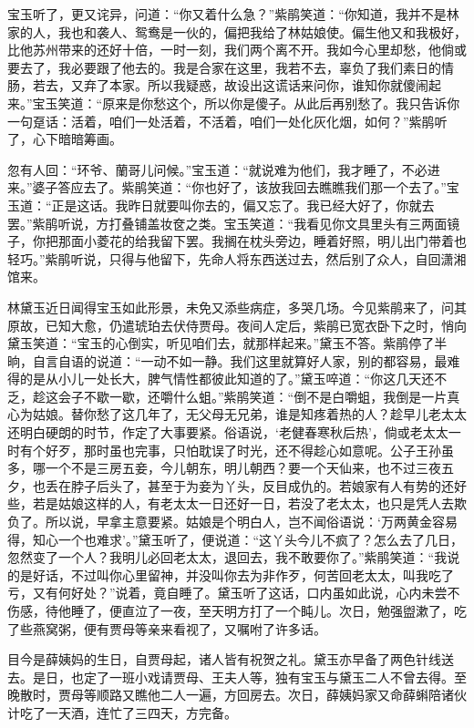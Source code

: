 \documentclass[12pt,oneside]{book}
\begin{document}
宝玉听了，更又诧异，问道：“你又着什么急？”紫鹃笑道：“你知道，我并不是林家的人，我也和袭人、鸳鸯是一伙的，偏把我给了林姑娘使。偏生他又和我极好，比他苏州带来的还好十倍，一时一刻，我们两个离不开。我如今心里却愁，他倘或要去了，我必要跟了他去的。我是合家在这里，我若不去，辜负了我们素日的情肠，若去，又弃了本家。所以我疑惑，故设出这谎话来问你，谁知你就傻闹起来。”宝玉笑道：“原来是你愁这个，所以你是傻子。从此后再别愁了。我只告诉你一句趸话：活着，咱们一处活着，不活着，咱们一处化灰化烟，如何？”紫鹃听了，心下暗暗筹画。

忽有人回：“环爷、蘭哥儿问候。”宝玉道：“就说难为他们，我才睡了，不必进来。”婆子答应去了。紫鹃笑道：“你也好了，该放我回去瞧瞧我们那一个去了。”宝玉道：“正是这话。我昨日就要叫你去的，偏又忘了。我已经大好了，你就去罢。”紫鹃听说，方打叠铺盖妆奁之类。宝玉笑道：“我看见你文具里头有三两面镜子，你把那面小菱花的给我留下罢。我搁在枕头旁边，睡着好照，明儿出门带着也轻巧。”紫鹃听说，只得与他留下，先命人将东西送过去，然后别了众人，自回潇湘馆来。

林黛玉近日闻得宝玉如此形景，未免又添些病症，多哭几场。今见紫鹃来了，问其原故，已知大愈，仍遣琥珀去伏侍贾母。夜间人定后，紫鹃已宽衣卧下之时，悄向黛玉笑道：“宝玉的心倒实，听见咱们去，就那样起来。”黛玉不答。紫鹃停了半晌，自言自语的说道：“一动不如一静。我们这里就算好人家，别的都容易，最难得的是从小儿一处长大，脾气情性都彼此知道的了。”黛玉啐道：“你这几天还不乏，趁这会子不歇一歇，还嚼什么蛆。”紫鹃笑道：“倒不是白嚼蛆，我倒是一片真心为姑娘。替你愁了这几年了，无父母无兄弟，谁是知疼着热的人？趁早儿老太太还明白硬朗的时节，作定了大事要紧。俗语说，‘老健春寒秋后热’，倘或老太太一时有个好歹，那时虽也完事，只怕耽误了时光，还不得趁心如意呢。公子王孙虽多，哪一个不是三房五妾，今儿朝东，明儿朝西？要一个天仙来，也不过三夜五夕，也丢在脖子后头了，甚至于为妾为丫头，反目成仇的。若娘家有人有势的还好些，若是姑娘这样的人，有老太太一日还好一日，若没了老太太，也只是凭人去欺负了。所以说，早拿主意要紧。姑娘是个明白人，岂不闻俗语说：‘万两黄金容易得，知心一个也难求’。”黛玉听了，便说道：“这丫头今儿不疯了？怎么去了几日，忽然变了一个人？我明儿必回老太太，退回去，我不敢要你了。”紫鹃笑道：“我说的是好话，不过叫你心里留神，并没叫你去为非作歹，何苦回老太太，叫我吃了亏，又有何好处？”说着，竟自睡了。黛玉听了这话，口内虽如此说，心内未尝不伤感，待他睡了，便直泣了一夜，至天明方打了一个盹儿。次日，勉强盥漱了，吃了些燕窝粥，便有贾母等亲来看视了，又嘱咐了许多话。

目今是薛姨妈的生日，自贾母起，诸人皆有祝贺之礼。黛玉亦早备了两色针线送去。是日，也定了一班小戏请贾母、王夫人等，独有宝玉与黛玉二人不曾去得。至晚散时，贾母等顺路又瞧他二人一遍，方回房去。次日，薛姨妈家又命薛蝌陪诸伙计吃了一天酒，连忙了三四天，方完备。
\end{document}

